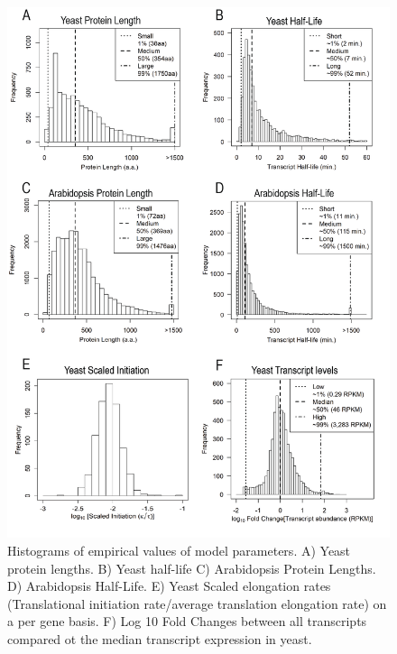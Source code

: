 \documentclass[a4,center,fleqn]{NAR}
\begin{document}
\begin{figure}[!ht]
\begin{center}
\includegraphics[width=120mm]{Images/2023-07-04_parameter_histograms.png}
\caption{Histograms of empirical values of model parameters. A) Yeast protein lengths. B) Yeast half-life C) Arabidopsis Protein Lengths. D) Arabidopsis Half-Life. E) Yeast Scaled elongation rates (Translational initiation rate/average translation elongation rate) on a per gene basis. F) Log 10 Fold Changes between all transcripts compared ot the median transcript expression in yeast. }
\end{center}
\end{figure}


\end{document}
